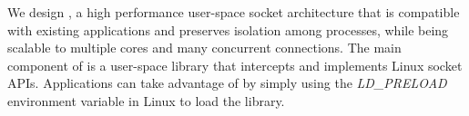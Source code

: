



We design \sys{}, a high performance user-space socket architecture that is compatible with existing applications and preserves isolation among processes, while being scalable to multiple cores and many concurrent connections. The main component of \sys{} is a user-space library \libipc{} that intercepts and implements Linux socket APIs. Applications can take advantage of \libipc by simply using the \textit{LD\_PRELOAD} environment variable in Linux to load the library.

